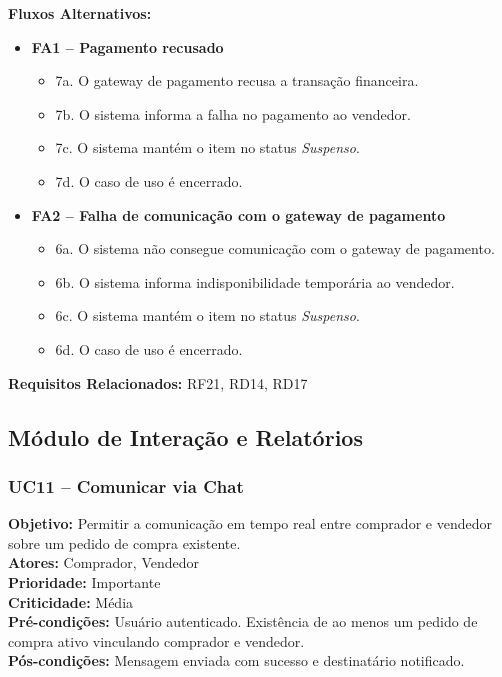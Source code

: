 ﻿\documentclass[12pt,a4paper]{article}
\begin{document}
\vspace{0.5em}
\noindent\textbf{Fluxos Alternativos:}
\begin{itemize}[leftmargin=*]
    \item \textbf{FA1 – Pagamento recusado}
    \begin{itemize}[label={}, leftmargin=0.5cm]
        \item 7a. O gateway de pagamento recusa a transação financeira.
        \item 7b. O sistema informa a falha no pagamento ao vendedor.
        \item 7c. O sistema mantém o item no status \textit{Suspenso}.
        \item 7d. O caso de uso é encerrado.
    \end{itemize}
    
    \item \textbf{FA2 – Falha de comunicação com o gateway de pagamento}
    \begin{itemize}[label={}, leftmargin=0.5cm]
        \item 6a. O sistema não consegue comunicação com o gateway de pagamento.
        \item 6b. O sistema informa indisponibilidade temporária ao vendedor.
        \item 6c. O sistema mantém o item no status \textit{Suspenso}.
        \item 6d. O caso de uso é encerrado.
    \end{itemize}
\end{itemize}

\vspace{0.5em}
\noindent\textbf{Requisitos Relacionados:} RF21, RD14, RD17

\subsection{Módulo de Interação e Relatórios}

\subsubsection{UC11 – Comunicar via Chat}
\label{uc:11}
\noindent\textbf{Objetivo:} Permitir a comunicação em tempo real entre comprador e vendedor sobre um pedido de compra existente.\\
\textbf{Atores:} Comprador, Vendedor\\
\textbf{Prioridade:} Importante\\
\textbf{Criticidade:} Média\\
\textbf{Pré-condições:} Usuário autenticado. Existência de ao menos um pedido de compra ativo vinculando comprador e vendedor.\\
\textbf{Pós-condições:} Mensagem enviada com sucesso e destinatário notificado.
\end{document}
